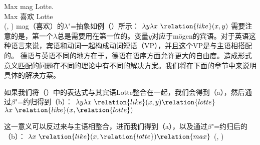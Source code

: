 \gll Max mag Lotte.\\
     Max 喜欢 Lotte\\
\ex {}(, )
\zl
mag（喜欢）的$\lambda$"=抽象如例（）所示：
\ea
$\lambda y \lambda x~\relation{like}(x, y)$
\z
需要注意的是，第一个$\lambda$总是需要用在第一位的。变量$y$对应于mögen的宾语。对于英语这种语言来说，宾语和动词一起构成动词短语（VP），并且这个VP是与主语相搭配的。
德语与英语不同的地方在于，德语在语序方面允许更大的自由度。造成形式意义匹配的问题在不同的理论中有不同的解决方案。我们将在下面的章节中来说明具体的解决方案。

如果我们将（）中的表达式与其宾语Lotte整合在一起，我们会得到（a），然后通过$\beta$"=约归得到（b）：
\eal
\label{lambda-moegen}
\ex $\lambda y \lambda x~\relation{like}(x, y) \relation{lotte}$
\ex $\lambda x~\relation{like}(x, \relation{lotte})$
\zl

\noindent
这一意义可以反过来与主语相整合，进而我们得到（a），以及通过$\beta$"=约归后的（b）：
\eal
\ex $\lambda x~\relation{like}(x, \relation{lotte}) \relation{max}$
\ex {}(, )
\zl

